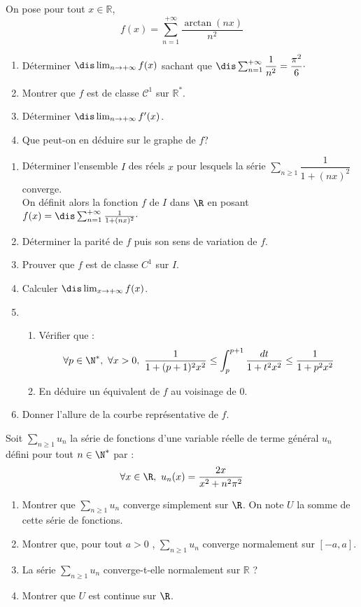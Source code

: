 \documentclass[a4paper,10pt]{report}
\newcommand{\Sum}[2]{\ensuremath{\textstyle{\sum\limits_{#1}^{#2}}}}
\begin{document}
\begin{Exa} On pose pour tout $x \in \mathbb{R}$,
$$ f(x) = \sum_{n=1}^{+ \infty} \dfrac{\arctan(nx)}{n^2}$$
\begin{enumerate}
\item Déterminer $\dis \lim_{n \rightarrow + \infty} f(x)$ sachant que $\dis \sum_{n=1}^{+ \infty} \dfrac{1}{n^2} = \dfrac{\pi^2}{6} \cdot$
\item Montrer que $f$ est de classe $\mathcal{C}^1$ sur $\mathbb{R}^*$.
\item Déterminer $\dis \lim_{n \rightarrow + \infty} f'(x)$.
\item Que peut-on en déduire sur le graphe de $f$?
\end{enumerate}
\end{Exa}



\begin{Exa} \begin{enumerate}
\item D\'eterminer l'ensemble $I$ des r\'eels $x$ pour lesquels la s\'erie $\Sum{n\geq 1}{} \dfrac{1}{1+(nx)^2}$ converge.\\
On d\'efinit alors la fonction $f$ de $I$ dans $\R$ en posant $f(x)=\dis \sum_{n=1}^{+\infty}\frac{1}{1+(nx)^2}\cdot$
\item D\'eterminer la parité de $f$ puis son sens de variation de $f$. 
\item Prouver que $f$ est de classe $C^1$ sur $I$.
\item Calculer $\dis \lim_{x\to +\infty}f(x)$.
\item
\begin{enumerate}
\item V\'erifier que :
\[\forall p\in \N^*,\ \forall x >0,\ \frac{1}{1+(p+1)^2x^2}\leq \int_p^{p+1}\frac{dt}{1+t^2x^2}\leq \frac{1}{1+p^2x^2}\] 
\item En d\'eduire un \'equivalent de $f$ au voisinage de $0$.
\end{enumerate}
\item Donner l'allure de la courbe repr\'esentative de $f$.
\end{enumerate}
\end{Exa}


\begin{Exa}  Soit $\Sum{n \geq 1}{} u_n$ la s\'erie de fonctions d'une variable r\'eelle de terme g\'en\'eral $u_n$ d\'efini pour tout $n \in \N^*$ par : 
$$ \forall x \in \R ,\ u_n(x)=\dfrac{2x}{x^2+n^2\pi^2}$$
\begin{enumerate}
\item Montrer que $\Sum{n \geq 1}{} u_n$ converge simplement sur $\R$. On note $U$ la somme de cette  s\'erie de fonctions.
\item Montrer que, pour tout $a > 0$ , $\Sum{n \geq 1}{} u_n$ converge normalement sur $[-a,a]$.
\item La s\'erie $\Sum{n \geq 1}{} u_n$ converge-t-elle normalement sur $\mathbb{R}$ ?
\item Montrer que $U$ est continue sur $\R$.
\end{enumerate}
\end{Exa}
\end{document}
